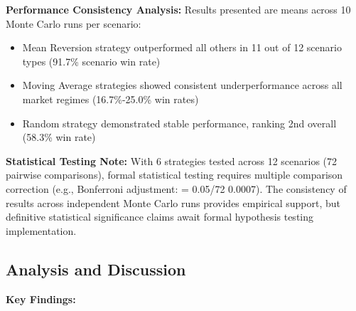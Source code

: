 \documentclass[11pt]{article}
\begin{document}
\textbf{Performance Consistency Analysis:}
Results presented are means across 10 Monte Carlo runs per scenario:
\begin{itemize}
\item Mean Reversion strategy outperformed all others in 11 out of 12 scenario types (91.7\% scenario win rate)
\item Moving Average strategies showed consistent underperformance across all market regimes (16.7\%-25.0\% win rates)
\item Random strategy demonstrated stable performance, ranking 2nd overall (58.3\% win rate)

\end{itemize}
\textbf{Statistical Testing Note:} With 6 strategies tested across 12 scenarios (72 pairwise comparisons), formal statistical testing requires multiple comparison correction (e.g., Bonferroni adjustment: \alpha = 0.05/72  0.0007). The consistency of results across independent Monte Carlo runs provides empirical support, but definitive statistical significance claims await formal hypothesis testing implementation.

\subsection{Analysis and Discussion}

\textbf{Key Findings:}
\end{document}
